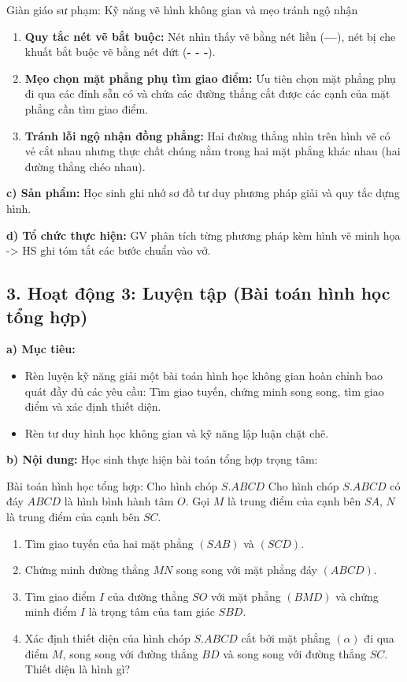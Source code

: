 \documentclass[12pt, a4paper]{article}
\begin{document}
\begin{scaffoldbox}{Giàn giáo sư phạm: Kỹ năng vẽ hình không gian và mẹo tránh ngộ nhận}
    \begin{enumerate}
        \item \textbf{Quy tắc nét vẽ bắt buộc:} Nét nhìn thấy vẽ bằng nét liền (\textbf{---}), nét bị che khuất bắt buộc vẽ bằng nét đứt (\textbf{- - -}).
        \item \textbf{Mẹo chọn mặt phẳng phụ tìm giao điểm:} Ưu tiên chọn mặt phẳng phụ đi qua các đỉnh sẵn có và chứa các đường thẳng cắt được các cạnh của mặt phẳng cần tìm giao điểm.
        \item \textbf{Tránh lỗi ngộ nhận đồng phẳng:} Hai đường thẳng nhìn trên hình vẽ có vẻ cắt nhau nhưng thực chất chúng nằm trong hai mặt phẳng khác nhau (hai đường thẳng chéo nhau).
    \end{enumerate}
\end{scaffoldbox}

\noindent \textbf{c) Sản phẩm:}
Học sinh ghi nhớ sơ đồ tư duy phương pháp giải và quy tắc dựng hình.

\noindent \textbf{d) Tổ chức thực hiện:}
GV phân tích từng phương pháp kèm hình vẽ minh họa -> HS ghi tóm tắt các bước chuẩn vào vở.

\subsection*{3. Hoạt động 3: Luyện tập (Bài toán hình học tổng hợp)}

\noindent \textbf{a) Mục tiêu:}
\begin{itemize}
    \item Rèn luyện kỹ năng giải một bài toán hình học không gian hoàn chỉnh bao quát đầy đủ các yêu cầu: Tìm giao tuyến, chứng minh song song, tìm giao điểm và xác định thiết diện.
    \item Rèn tư duy hình học không gian và kỹ năng lập luận chặt chẽ.
\end{itemize}

\noindent \textbf{b) Nội dung:}
Học sinh thực hiện bài toán tổng hợp trọng tâm:

\begin{pedabox}{Bài toán hình học tổng hợp: Cho hình chóp $S.ABCD$}
    Cho hình chóp $S.ABCD$ có đáy $ABCD$ là hình bình hành tâm $O$. Gọi $M$ là trung điểm của cạnh bên $SA$, $N$ là trung điểm của cạnh bên $SC$.
    \begin{enumerate}
        \item Tìm giao tuyến của hai mặt phẳng $(SAB)$ và $(SCD)$.
        \item Chứng minh đường thẳng $MN$ song song với mặt phẳng đáy $(ABCD)$.
        \item Tìm giao điểm $I$ của đường thẳng $SO$ với mặt phẳng $(BMD)$ và chứng minh điểm $I$ là trọng tâm của tam giác $SBD$.
        \item Xác định thiết diện của hình chóp $S.ABCD$ cắt bởi mặt phẳng $(\alpha)$ đi qua điểm $M$, song song với đường thẳng $BD$ và song song với đường thẳng $SC$. Thiết diện là hình gì?
    \end{enumerate}
\end{pedabox}
\end{document}
